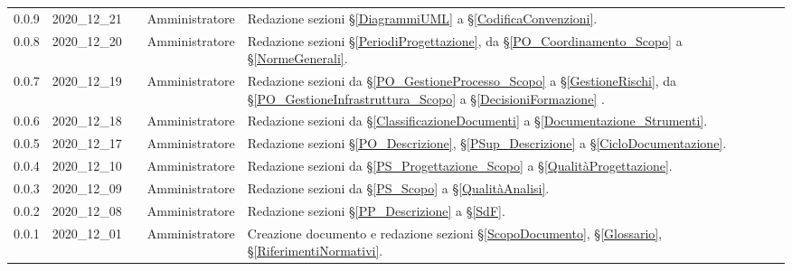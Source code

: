{\begin{longtable}{ c c  C{2.3cm} C{3cm} C{3.2cm}}
    0.0.9 & 2020\_12\_21 & \TG{}  & Amministratore & Redazione sezioni \S\ref{DiagrammiUML} a \S\ref{CodificaConvenzioni}. \\
    
    0.0.8 & 2020\_12\_20 & \TG{}  & Amministratore & Redazione sezioni \S\ref{PeriodiProgettazione}, da \S\ref{PO_Coordinamento_Scopo} a \S\ref{NormeGenerali}. \\
    
     0.0.7 & 2020\_12\_19 & \TG{}  & Amministratore & Redazione sezioni da \S\ref{PO_GestioneProcesso_Scopo} a \S\ref{GestioneRischi}, da \S\ref{PO_GestioneInfrastruttura_Scopo} a \S\ref{DecisioniFormazione} . \\
    
    0.0.6 & 2020\_12\_18 & \TG{}  & Amministratore & Redazione sezioni da \S\ref{ClassificazioneDocumenti} a \S\ref{Documentazione_Strumenti}. \\
    
    0.0.5 & 2020\_12\_17 & \TG{} & Amministratore  & Redazione sezioni \S\ref{PO_Descrizione}, \S\ref{PSup_Descrizione} a \S\ref{CicloDocumentazione}. \\
    
     0.0.4 & 2020\_12\_10 & \TG{} & Amministratore  & Redazione sezioni da \S\ref{PS_Progettazione_Scopo} a \S\ref{QualitàProgettazione}. \\
    
     0.0.3 & 2020\_12\_09 & \TG{} & Amministratore  & Redazione sezioni da \S\ref{PS_Scopo} a \S\ref{QualitàAnalisi}.  \\
     
     0.0.2 & 2020\_12\_08 & \TG{} & Amministratore  & Redazione sezioni \S\ref{PP_Descrizione} a \S\ref{SdF}.  \\      
            
    0.0.1 & 2020\_12\_01 & \TG{} & Amministratore  & Creazione documento e redazione sezioni \S\ref{ScopoDocumento}, \S\ref{Glossario}, \S\ref{RiferimentiNormativi}.  \\
			
\end{longtable}
}